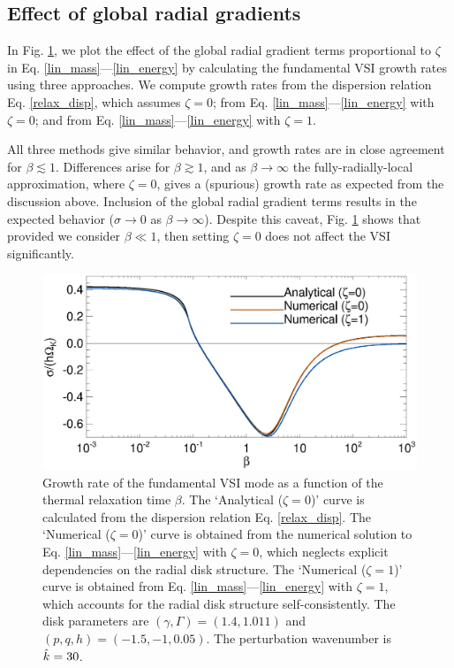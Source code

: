 \subsection{Effect of global radial gradients}
In  Fig. \ref{gcorr_compare}, we plot the effect of the global radial gradient terms
proportional to $\zeta$ in Eq. \ref{lin_mass}---\ref{lin_energy}
by calculating the
fundamental VSI growth rates using three approaches. We compute growth rates from the dispersion
relation Eq. \ref{relax_disp}, which assumes $\zeta=0$;  from
Eq. \ref{lin_mass}---\ref{lin_energy} with $\zeta=0$; and from
Eq. \ref{lin_mass}---\ref{lin_energy}  with $\zeta=1$.   

All three methods give similar behavior, and growth rates are in close
agreement for $\beta\lesssim 1$. Differences arise for 
$\beta\gtrsim1$, and as $\beta\to\infty$ the fully-radially-local
approximation, where $\zeta=0$, gives a
(spurious) growth rate as expected from the discussion
above. Inclusion of the global radial gradient terms results in the
expected behavior  ($\sigma\to0$ as $\beta\to\infty$). Despite this
caveat, Fig. \ref{gcorr_compare} shows that provided we consider 
$\beta\ll1$, then setting $\zeta=0$ does not affect the VSI
significantly.  
  
\begin{figure}
  \includegraphics[width=\linewidth,clip=true,trim=0cm 0.0cm 0cm
  0cm]{figures/gcorr_compare} 
  \caption{Growth rate of the fundamental VSI mode as a function of
    the thermal relaxation time $\beta$. The `Analytical ($\zeta=0$)' curve
    is calculated from the dispersion relation Eq. \ref{relax_disp}. 
    The `Numerical ($\zeta=0$)' curve is obtained from the numerical
    solution to Eq. \ref{lin_mass}---\ref{lin_energy} with
    $\zeta=0$,  which 
    neglects explicit dependencies on the radial disk structure.  
    The `Numerical
    ($\zeta=1$)' curve is obtained from Eq. \ref{lin_mass}---\ref{lin_energy} with
    $\zeta=1$, which accounts for the radial disk structure self-consistently.   
    The disk parameters are $(\gamma, \Gamma)=(1.4, 1.011)$ and
    $(p,q,h)=(-1.5,-1,0.05)$. The perturbation 
    wavenumber is $\hat{k}=30$. 
    \label{gcorr_compare}}  
\end{figure}










